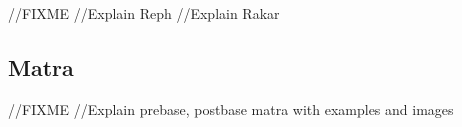 

//FIXME
//Explain Reph
//Explain Rakar

\subsection*{Matra}
//FIXME
//Explain prebase, postbase matra with examples and images






